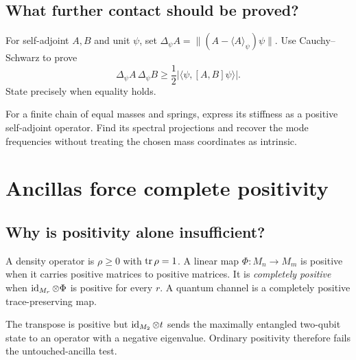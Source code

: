 \section{What further contact should be proved?}

\begin{exercise}
For self-adjoint $A,B$ and unit $\psi$, set
$\Delta_\psi A=\|(A-\langle A\rangle_\psi)\psi\|$.  Use Cauchy--Schwarz to
prove
\[
\Delta_\psi A\,\Delta_\psi B
\geq\frac12|\langle\psi,[A,B]\psi\rangle|.
\]
State precisely when equality holds.
\end{exercise}

\begin{exercise}
For a finite chain of equal masses and springs, express its stiffness as a
positive self-adjoint operator.  Find its spectral projections and recover
the mode frequencies without treating the chosen mass coordinates as
intrinsic.
\end{exercise}


\chapter{Ancillas force complete positivity}
\label{ch:channels}



\section{Why is positivity alone insufficient?}

A density operator is $\rho\geq0$ with $\operatorname{tr}\rho=1$.  A linear map
$\Phi:M_n\to M_m$ is positive when it carries positive matrices to positive
matrices.  It is \emph{completely positive} when
$\operatorname{id}_{M_r}\otimes\Phi$ is positive for every $r$.  A quantum channel is a
completely positive trace-preserving map.

The transpose is positive but $\operatorname{id}_{M_2}\otimes t$ sends the maximally
entangled two-qubit state to an operator with a negative eigenvalue.  Ordinary
positivity therefore fails the untouched-ancilla test.

